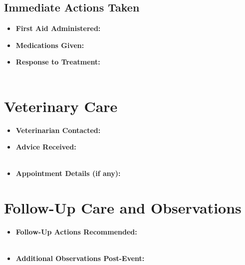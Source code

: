 \documentclass{article}
\begin{document}
\subsection*{Immediate Actions Taken}
\begin{itemize}
    \item \textbf{First Aid Administered:} \underline{\hspace{\textwidth}}
    \item \textbf{Medications Given:} \underline{\hspace{\textwidth}}
    \item \textbf{Response to Treatment:} \\
    \underline{\hspace{\textwidth}} \\
    \underline{\hspace{\textwidth}}
\end{itemize}

\section*{Veterinary Care}
\begin{itemize}
    \item \textbf{Veterinarian Contacted:} \underline{\hspace{6cm}}
    \item \textbf{Advice Received:} \\
    \underline{\hspace{\textwidth}} \\
    \underline{\hspace{\textwidth}}
    \item \textbf{Appointment Details (if any):} \\
    \underline{\hspace{\textwidth}}
\end{itemize}

\section*{Follow-Up Care and Observations}
\begin{itemize}
    \item \textbf{Follow-Up Actions Recommended:} \\
    \underline{\hspace{\textwidth}} \\
    \underline{\hspace{\textwidth}}
    \item \textbf{Additional Observations Post-Event:} \\
    \underline{\hspace{\textwidth}} \\
    \underline{\hspace{\textwidth}}
\end{itemize}
\end{document}
